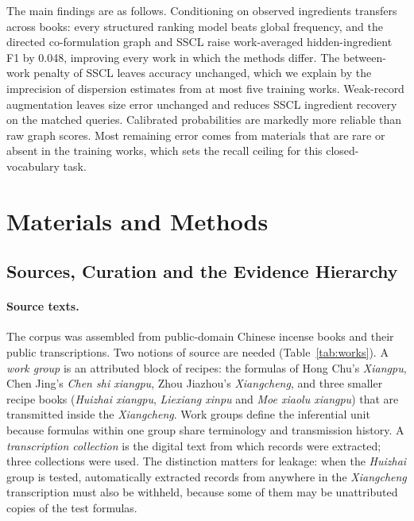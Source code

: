 \documentclass[applsci,article,submit,oneauthor]{Definitions/mdpi}
\begin{document}
The main findings are as follows. Conditioning on observed ingredients transfers across books: every structured ranking model beats global frequency, and the directed co-formulation graph and SSCL raise work-averaged hidden-ingredient F1 by 0.048, improving every work in which the methods differ. The between-work penalty of SSCL leaves accuracy unchanged, which we explain by the imprecision of dispersion estimates from at most five training works. Weak-record augmentation leaves size error unchanged and reduces SSCL ingredient recovery on the matched queries. Calibrated probabilities are markedly more reliable than raw graph scores. Most remaining error comes from materials that are rare or absent in the training works, which sets the recall ceiling for this closed-vocabulary task.

\section{Materials and Methods}
\label{sec:methods}

\subsection{Sources, Curation and the Evidence Hierarchy}
\label{sec:data}

\paragraph{Source texts.} The corpus was assembled from public-domain Chinese incense books and their public transcriptions. Two notions of source are needed (Table~\ref{tab:works}). A \emph{work group} is an attributed block of recipes: the formulas of Hong Chu's \emph{Xiangpu}, Chen Jing's \emph{Chen shi xiangpu}, Zhou Jiazhou's \emph{Xiangcheng}, and three smaller recipe books (\emph{Huizhai xiangpu}, \emph{Liexiang xinpu} and \emph{Moe xiaolu xiangpu}) that are transmitted inside the \emph{Xiangcheng}. Work groups define the inferential unit because formulas within one group share terminology and transmission history. A \emph{transcription collection} is the digital text from which records were extracted; three collections were used. The distinction matters for leakage: when the \emph{Huizhai} group is tested, automatically extracted records from anywhere in the \emph{Xiangcheng} transcription must also be withheld, because some of them may be unattributed copies of the test formulas.
\end{document}

